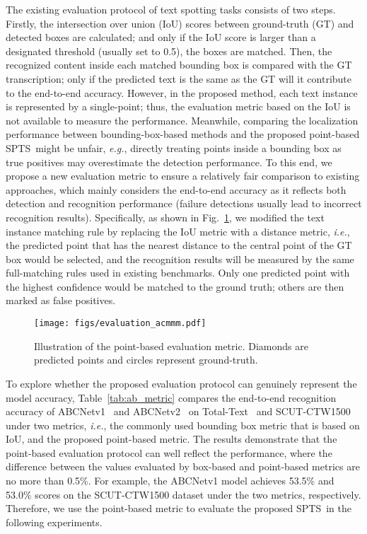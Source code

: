 \documentclass[sigconf]{acmart}
\newcommand{\methodName}{SPTS}
\begin{document}
    
The existing evaluation protocol of text spotting tasks consists of two steps. Firstly, the intersection over union (IoU) scores between ground-truth (GT) and detected boxes are calculated; and only if the IoU score is larger than a designated threshold (usually set to 0.5), the boxes are matched. Then, the recognized content inside each matched bounding box is compared with the GT transcription; only if the predicted text is the same as the GT will it contribute to the end-to-end accuracy. However, in the proposed method, each text instance is represented by a single-point; thus, the evaluation metric based on the IoU is not available to measure the performance. Meanwhile, comparing the localization performance between bounding-box-based methods and the proposed point-based \methodName\ might be unfair, \emph{e.g.}, directly treating points inside a bounding box as true positives may overestimate the detection performance. To this end, we propose a new evaluation metric to ensure a relatively fair comparison to existing approaches, which mainly considers the end-to-end accuracy as it reflects both detection and recognition performance (failure detections usually lead to incorrect recognition results). Specifically, as shown in Fig.~\ref{fig:eval}, we modified the text instance matching rule by replacing the IoU metric with a distance metric, \emph{i.e.}, the predicted point that has the nearest distance to the central point of the GT box would be selected, and the recognition results will be measured by the same full-matching rules used in existing benchmarks. Only one predicted point with the highest confidence would be matched to the ground truth; others are then marked as false positives. 
    
\begin{figure}[t!]
    \centering
    \texttt{[image: figs/evaluation\_acmmm.pdf]}
    \caption{Illustration of the point-based evaluation metric. Diamonds are predicted points and circles represent ground-truth.}
    \label{fig:eval}
\end{figure}
    
To explore whether the proposed evaluation protocol can genuinely represent the model accuracy, Table~\ref{tab:ab_metric} compares the end-to-end recognition accuracy of ABCNetv1~\cite{liu2020abcnet} and ABCNetv2~\cite{liu2021abcnetv2} on Total-Text~\cite{ch2017total} and SCUT-CTW1500~\cite{liu2019curved} under two metrics, \emph{i.e.}, the commonly used bounding box metric that is based on IoU, and the proposed point-based metric. The results demonstrate that the point-based evaluation protocol can well reflect the performance, where the difference between the values evaluated by box-based and point-based metrics are 
no more than 0.5\%. For example, the ABCNetv1 model achieves 53.5\% and 53.0\% scores on the SCUT-CTW1500 dataset under the two metrics, respectively. Therefore, we use the point-based metric to evaluate the proposed \methodName\ in the following experiments.
    
\end{document}
